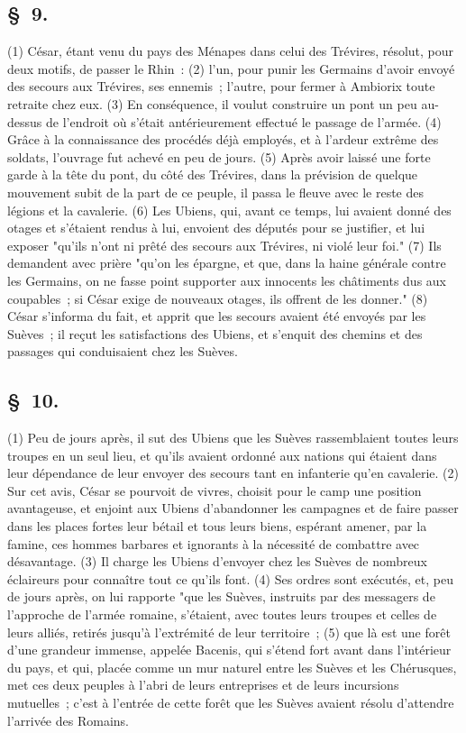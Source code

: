 \documentclass[french,twoside]{book} %
\begin{document}
\subsection[{§ 9.}]{ \textsc{§ 9.} }
\noindent (1) César, étant venu du pays des Ménapes dans celui des Trévires, résolut, pour deux motifs, de passer le Rhin : (2) l’un, pour punir les Germains d’avoir envoyé des secours aux Trévires, ses ennemis ; l’autre, pour fermer à Ambiorix toute retraite chez eux. (3) En conséquence, il voulut construire un pont un peu au-dessus de l’endroit où s’était antérieurement effectué le passage de l’armée. (4) Grâce à la connaissance des procédés déjà employés, et à l’ardeur extrême des soldats, l’ouvrage fut achevé en peu de jours. (5) Après avoir laissé une forte garde à la tête du pont, du côté des Trévires, dans la prévision de quelque mouvement subit de la part de ce peuple, il passa le fleuve avec le reste des légions et la cavalerie. (6) Les Ubiens, qui, avant ce temps, lui avaient donné des otages et s’étaient rendus à lui, envoient des députés pour se justifier, et lui exposer "qu’ils n’ont ni prêté des secours aux Trévires, ni violé leur foi." (7) Ils demandent avec prière "qu’on les épargne, et que, dans la haine générale contre les Germains, on ne fasse point supporter aux innocents les châtiments dus aux coupables ; si César exige de nouveaux otages, ils offrent de les donner." (8) César s’informa du fait, et apprit que les secours avaient été envoyés par les Suèves ; il reçut les satisfactions des Ubiens, et s’enquit des chemins et des passages qui conduisaient chez les Suèves.
\subsection[{§ 10.}]{ \textsc{§ 10.} }
\noindent (1) Peu de jours après, il sut des Ubiens que les Suèves rassemblaient toutes leurs troupes en un seul lieu, et qu’ils avaient ordonné aux nations qui étaient dans leur dépendance de leur envoyer des secours tant en infanterie qu’en cavalerie. (2) Sur cet avis, César se pourvoit de vivres, choisit pour le camp une position avantageuse, et enjoint aux Ubiens d’abandonner les campagnes et de faire passer dans les places fortes leur bétail et tous leurs biens, espérant amener, par la famine, ces hommes barbares et ignorants à la nécessité de combattre avec désavantage. (3) Il charge les Ubiens d’envoyer chez les Suèves de nombreux éclaireurs pour connaître tout ce qu’ils font. (4) Ses ordres sont exécutés, et, peu de jours après, on lui rapporte "que les Suèves, instruits par des messagers de l’approche de l’armée romaine, s’étaient, avec toutes leurs troupes et celles de leurs alliés, retirés jusqu’à l’extrémité de leur territoire ; (5) que là est une forêt d’une grandeur immense, appelée Bacenis, qui s’étend fort avant dans l’intérieur du pays, et qui, placée comme un mur naturel entre les Suèves et les Chérusques, met ces deux peuples à l’abri de leurs entreprises et de leurs incursions mutuelles ; c’est à l’entrée de cette forêt que les Suèves avaient résolu d’attendre l’arrivée des Romains.
\end{document}
